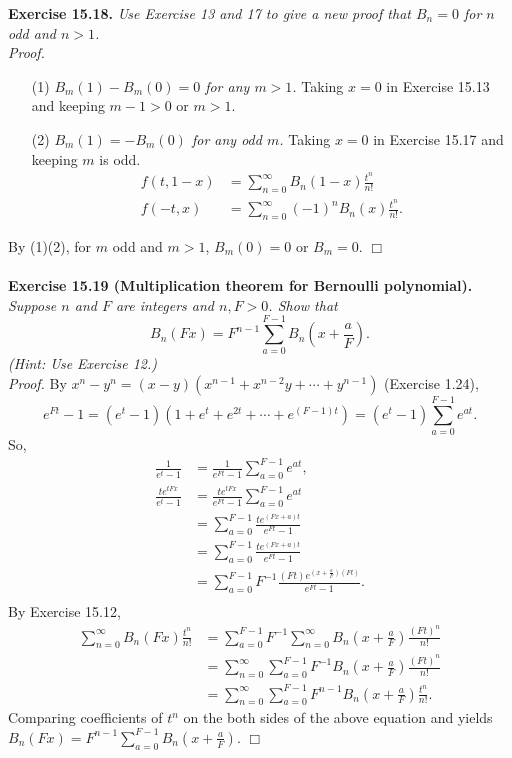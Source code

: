 \documentclass{article}
\begin{document}
\textbf{Exercise 15.18.}
\emph{Use Exercise 13 and 17 to give a new proof that
$B_n = 0$ for $n$ odd and $n > 1$.} \\

\emph{Proof.}
\begin{enumerate}
\item[(1)]
\emph{$B_m(1) - B_m(0) = 0$ for any $m > 1$.}
Taking $x = 0$ in Exercise 15.13 and keeping $m - 1 > 0$ or $m > 1$.
\item[(2)]
\emph{$B_m(1) = -B_m(0)$ for any odd $m$.}
Taking $x = 0$ in Exercise 15.17 and keeping $m$ is odd.
\begin{align*}
f(t, 1-x)
&= \sum_{n=0}^{\infty} B_n(1-x) \frac{t^n}{n!} \\
f(-t, x)
&= \sum_{n=0}^{\infty} (-1)^n B_n(x) \frac{t^n}{n!}.
\end{align*}
\end{enumerate}
By (1)(2), for $m$ odd and $m > 1$, $B_m(0) = 0$ or $B_m = 0$.
$\Box$ \\\\



\textbf{Exercise 15.19 (Multiplication theorem for Bernoulli polynomial).}
\emph{Suppose $n$ and $F$ are integers and $n, F > 0$. Show that
$$B_n(Fx) = F^{n-1} \sum_{a=0}^{F-1} B_n \left(x + \frac{a}{F} \right).$$
(Hint: Use Exercise 12.)} \\

\emph{Proof.}
By $x^n - y^n = (x - y)(x^{n-1} + x^{n-2}y + \cdots + y^{n-1})$ (Exercise 1.24),
$$e^{Ft} - 1
= (e^t - 1)(1 + e^t + e^{2t} + \cdots + e^{(F-1)t})
= (e^t - 1) \sum_{a=0}^{F-1} e^{at}.$$
So,
\begin{align*}
\frac{1}{e^t - 1}
&= \frac{1}{e^{Ft} - 1} \sum_{a=0}^{F-1} e^{at}, \\
\frac{te^{tFx}}{e^t - 1}
&= \frac{te^{tFx}}{e^{Ft} - 1} \sum_{a=0}^{F-1} e^{at} \\
&= \sum_{a=0}^{F-1} \frac{te^{(Fx+a)t}}{e^{Ft} - 1} \\
&= \sum_{a=0}^{F-1} \frac{te^{(Fx+a)t}}{e^{Ft} - 1} \\
&= \sum_{a=0}^{F-1} F^{-1} \frac{(Ft) e^{(x + \frac{a}{F})(Ft)}}{e^{Ft} - 1}. \\
\end{align*}
By Exercise 15.12,
\begin{align*}
\sum_{n=0}^{\infty} B_n(Fx) \frac{t^n}{n!}
&= \sum_{a=0}^{F-1} F^{-1}
\sum_{n=0}^{\infty} B_n \left( x + \frac{a}{F} \right) \frac{(Ft)^n}{n!} \\
&= \sum_{n=0}^{\infty} \sum_{a=0}^{F-1} F^{-1}
B_n \left( x + \frac{a}{F} \right) \frac{(Ft)^n}{n!} \\
&= \sum_{n=0}^{\infty} \sum_{a=0}^{F-1} F^{n-1}
B_n \left( x + \frac{a}{F} \right) \frac{t^n}{n!}.
\end{align*}
Comparing coefficients of $t^n$ on the both sides of the above equation
and yields
$B_n(Fx) = F^{n-1} \sum_{a=0}^{F-1} B_n \left(x + \frac{a}{F} \right)$.
$\Box$ \\
\end{document}
